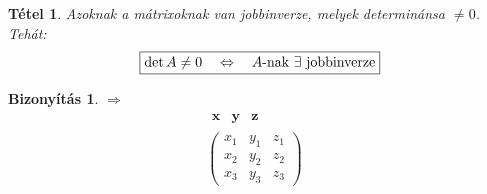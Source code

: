 \documentclass[a4paper,12pt,twoside]{book}
\newcommand{\vek}[1]{\mathbf{#1}} %
\newtheorem{tetel}{Tétel}[chapter]
\theoremstyle{break}
\newtheorem{bizNL}[biz]{Bizonyítás}
\begin{document}
\begin{tetel}
 Azoknak a mátrixoknak van jobbinverze, melyek determinánsa $\neq 0$. Tehát:
 \[\boxed{\det A \neq 0 \quad \Leftrightarrow \quad \hbox{$A$-nak $\exists$ jobbinverze}}\]
\end{tetel}
\begin{bizNL}
$\Rightarrow$
 \[\begin{matrix}
& \begin{matrix} \vek{x} & \vek{y} & \vek{z} \end{matrix} \\
& \begin{pmatrix}
x_1 & y_1 & z_1 \\
x_2 & y_2 & z_2 \\
x_3 & y_3 & z_3
\end{pmatrix} & & \\


\end{matrix}\]
\end{bizNL}
\end{document}
